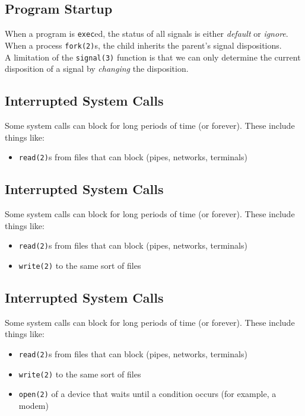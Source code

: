 \documentclass[xga]{xdvislides}
\begin{document}
\subsection{Program Startup}

When a program is {\tt exec}ed, the status of all signals is either {\em
default} or {\em ignore}.
\\

When a process {\tt fork(2)}s, the child inherits the parent's signal
dispositions.
\\

A limitation of the {\tt signal(3)} function is that we can only determine the
current disposition of a signal by {\em changing} the disposition.

\subsection{Interrupted System Calls}

Some system calls can block for long periods of time (or forever). These
include things like:

\begin{itemize}
	\item {\tt read(2)}s from files that can block (pipes, networks, terminals)
\end{itemize}

\subsection{Interrupted System Calls}

Some system calls can block for long periods of time (or forever). These
include things like:

\begin{itemize}
	\item {\tt read(2)}s from files that can block (pipes, networks, terminals)
	\item {\tt write(2)} to the same sort of files
\end{itemize}

\subsection{Interrupted System Calls}

Some system calls can block for long periods of time (or forever). These
include things like:

\begin{itemize}
	\item {\tt read(2)}s from files that can block (pipes, networks, terminals)
	\item {\tt write(2)} to the same sort of files
	\item {\tt open(2)} of a device that waits until a condition occurs (for example, a modem)
\end{itemize}
\end{document}
